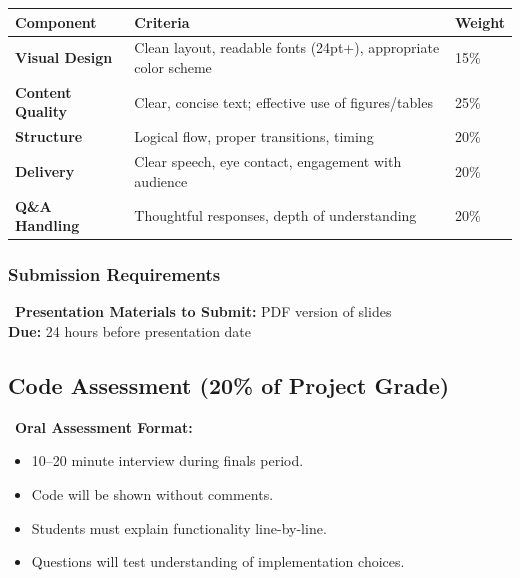 \documentclass[10pt,letterpaper]{article}
\begin{document}
\begin{center}
\small
\renewcommand{\arraystretch}{1.18}
\begin{tabularx}{\textwidth}{>{\bfseries}p{2.6cm}Xp{1.3cm}}
\toprule
\rowcolor{accentblue!10}
Component & Criteria & Weight\\
\midrule
Visual Design & Clean layout, readable fonts (24pt+), appropriate color scheme & 15\%\\
Content Quality & Clear, concise text; effective use of figures/tables & 25\%\\
Structure & Logical flow, proper transitions, timing & 20\%\\
Delivery & Clear speech, eye contact, engagement with audience & 20\%\\
Q\&A Handling & Thoughtful responses, depth of understanding & 20\%\\
\bottomrule
\end{tabularx}
\end{center}

\subsubsection{Submission Requirements}

\begin{goldbox}
\faFilePdf\ \textbf{Presentation Materials to Submit:} PDF version of slides\\
\phantom{\faFilePdf\ }\textbf{Due:} 24 hours before presentation date
\end{goldbox}

\subsection{Code Assessment (20\% of Project Grade)}

\begin{graybox}
\faComments\ \textbf{Oral Assessment Format:}
\begin{itemize}
  \item 10--20 minute interview during finals period.
  \item Code will be shown without comments.
  \item Students must explain functionality line-by-line.
  \item Questions will test understanding of implementation choices.
\end{itemize}
\end{graybox}
\end{document}
